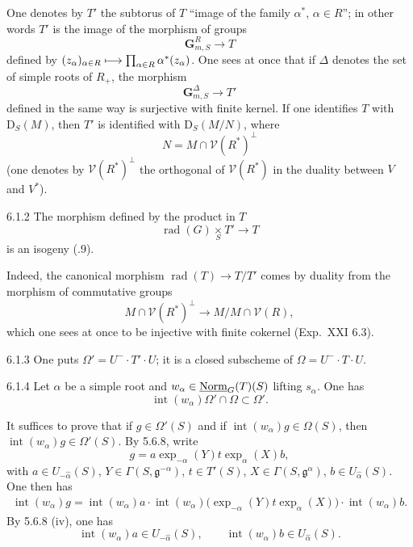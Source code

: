 \label{XXII.6.1.1}
One denotes by $T'$ the subtorus of $T$ ``image of the family $\alpha^*$, $\alpha\in R$''; in other words $T'$ is the image of the morphism of groups
\[
\mathbf G_{m,S}^R\to T
\]
defined by $(z_\alpha)_{\alpha\in R}\longmapsto\prod_{\alpha\in R}\alpha^*(z_\alpha)$. One sees at once that if $\Delta$ denotes the set of simple roots of $R_+$, the morphism
\[
\mathbf G_{m,S}^\Delta\to T'
\]
defined in the same way is surjective with finite kernel. If one identifies $T$ with $\mathrm D_S(M)$, then $T'$ is identified with $\mathrm D_S(M/N)$, where
\[
N=M\cap\mathcal V(R^*)^\perp
\]
(one denotes by $\mathcal V(R^*)^\perp$ the orthogonal of $\mathcal V(R^*)$ in the duality between $V$ and $V^*$).
\begin{lemma}{6.1.2}\label{XXII.6.1.2}
The morphism defined by the product in $T$
\[
\operatorname{rad}(G)\underset S\times T'\to T
\]
is an isogeny (.9).
\end{lemma}
Indeed, the canonical morphism $\operatorname{rad}(T)\to T/T'$ comes by duality from the morphism of commutative groups
\[
M\cap\mathcal V(R^*)^\perp\to M/M\cap\mathcal V(R),
\]
which one sees at once to be injective with finite cokernel (\cf Exp.~XXI 6.3).
\begin{definition}{6.1.3}\label{XXII.6.1.3}
One puts $\Omega'=U^-\cdot T'\cdot U$; it is a closed subscheme of $\Omega=U^-\cdot T\cdot U$.
\end{definition}
\begin{lemma}{6.1.4}\label{XXII.6.1.4}
Let $\alpha$ be a simple root and $w_\alpha\in\underline{\mathrm{Norm}}_G(T)(S)$ lifting $s_\alpha$. One has
\[
\operatorname{int}(w_\alpha)\Omega'\cap\Omega\subset\Omega'.
\]
\end{lemma}
It suffices to prove that if $g\in\Omega'(S)$ and if $\operatorname{int}(w_\alpha)g\in\Omega(S)$, then $\operatorname{int}(w_\alpha)g\in\Omega'(S)$. By 5.6.8, write
\[
g=a\exp_{-\alpha}(Y)t\exp_\alpha(X)b,
\]
with $a\in U_{-\widehat\alpha}(S)$, $Y\in\Gamma(S,\mathfrak g^{-\alpha})$, $t\in T'(S)$, $X\in\Gamma(S,\mathfrak g^\alpha)$, $b\in U_{\widehat\alpha}(S)$. One then has
\[
\begin{gathered}
\operatorname{int}(w_\alpha)g=\operatorname{int}(w_\alpha)a\cdot
\operatorname{int}(w_\alpha)\bigl(\exp_{-\alpha}(Y)t\exp_\alpha(X)\bigr)\cdot\operatorname{int}(w_\alpha)b.
\end{gathered}
\]
By 5.6.8 (iv), one has
\[
\operatorname{int}(w_\alpha)a\in U_{-\widehat\alpha}(S),\qquad
\operatorname{int}(w_\alpha)b\in U_{\widehat\alpha}(S).
\]
